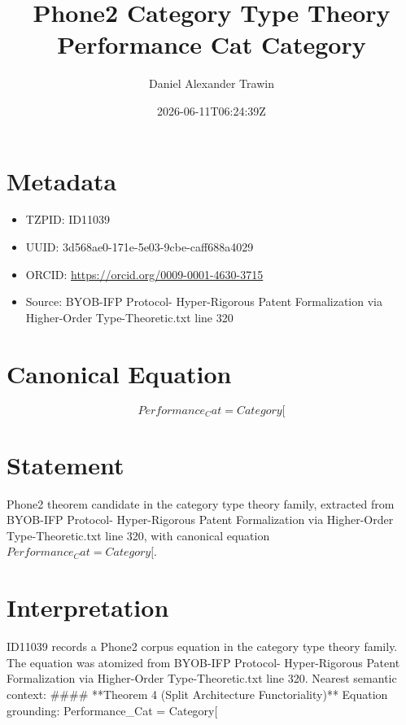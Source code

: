 \documentclass[11pt]{article}
\title{Phone2 Category Type Theory Performance Cat Category}
\author{Daniel Alexander Trawin}
\date{2026-06-11T06:24:39Z}
\begin{document}
\maketitle
\section*{Metadata}
\begin{itemize}
\item TZPID: ID11039
\item UUID: 3d568ae0-171e-5e03-9cbe-caff688a4029
\item ORCID: \url{https://orcid.org/0009-0001-4630-3715}
\item Source: BYOB-IFP Protocol- Hyper-Rigorous Patent Formalization via Higher-Order Type-Theoretic.txt line 320
\end{itemize}
\section*{Canonical Equation}
\[
Performance_Cat = Category[
\]
\section*{Statement}
Phone2 theorem candidate in the category type theory family, extracted from BYOB-IFP Protocol- Hyper-Rigorous Patent Formalization via Higher-Order Type-Theoretic.txt line 320, with canonical equation $Performance_Cat = Category[$.
\section*{Interpretation}
ID11039 records a Phone2 corpus equation in the category type theory family. The equation was atomized from BYOB-IFP Protocol- Hyper-Rigorous Patent Formalization via Higher-Order Type-Theoretic.txt line 320. Nearest semantic context: #### **Theorem 4 (Split Architecture Functoriality)** Equation grounding: Performance_Cat = Category[
\end{document}
